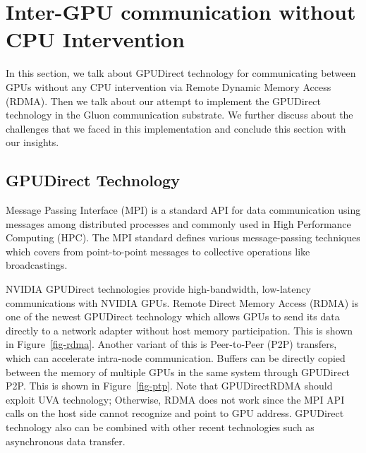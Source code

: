 \section{Inter-GPU communication without CPU Intervention}
In this section, we talk about GPUDirect technology for communicating between GPUs without any CPU intervention via Remote Dynamic Memory Access (RDMA). Then we talk about our attempt to implement the GPUDirect technology in the Gluon communication substrate.
We further discuss about the challenges that we faced in this implementation and conclude this section with our insights. 

\subsection{GPUDirect Technology}
Message Passing Interface (MPI) is a standard API for data communication using messages among distributed processes
and commonly used in High Performance Computing (HPC).
The MPI standard defines various message-passing techniques which covers from point-to-point messages to collective operations like broadcastings. 




NVIDIA GPUDirect technologies provide high-bandwidth, low-latency communications with NVIDIA GPUs.
Remote Direct Memory Access (RDMA) is one of the newest GPUDirect technology which allows GPUs to
send its data directly to a network adapter without host memory participation. This is shown in Figure~\ref{fig-rdma}.
Another variant of this is Peer-to-Peer (P2P) transfers, which can accelerate intra-node communication.
Buffers can be directly copied between the memory of multiple GPUs in the same system through GPUDirect P2P. This is shown in Figure~\ref{fig-ptp}. 
Note that GPUDirectRDMA should exploit UVA technology; Otherwise, RDMA does not work since the MPI API calls on the host side cannot
recognize and point to GPU address.
GPUDirect technology also can be combined with other recent technologies such as asynchronous data transfer.


